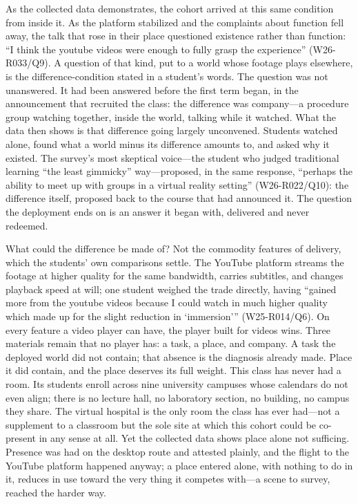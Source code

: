 As the collected data demonstrates, the cohort arrived at this same
condition from inside it. As the platform stabilized and the
complaints about function fell away, the talk that rose in their place
questioned existence rather than function: ``I think the youtube
videos were enough to fully grasp the experience'' (W26-R033/Q9). A
question of that kind, put to a world whose footage plays elsewhere,
is the difference-condition stated in a student's words. The question
was not unanswered. It had been answered before the first term began,
in the announcement that recruited the class: the difference was
company---a procedure group watching together, inside the world,
talking while it watched. What the data then shows is that
difference going largely unconvened. Students watched alone, found
what a world minus its difference amounts to, and asked why it
existed. The survey's most skeptical voice---the student who judged
traditional learning ``the least gimmicky'' way---proposed, in the
same response, ``perhaps the ability to meet up with groups in a
virtual reality setting'' (W26-R022/Q10): the difference itself,
proposed back to the course that had announced it. The question the
deployment ends on is an answer it began with, delivered and never
redeemed.

What could the difference be made of? Not the commodity features of
delivery, which the students' own comparisons settle. The YouTube
platform streams the footage at higher quality for the same bandwidth,
carries subtitles, and changes playback speed at will; one student
weighed the trade directly, having ``gained more from the youtube
videos because I could watch in much higher quality which made up for
the slight reduction in `immersion'{}'' (W25-R014/Q6). On every
feature a video player can have, the player built for videos wins.
Three materials remain that no player has: a task, a place, and
company. A task the deployed world did not contain; that absence is
the diagnosis already made. Place it did contain, and the place
deserves its full weight. This class has never had a room. Its
students enroll across nine university campuses whose calendars do not
even align; there is no lecture hall, no laboratory section, no
building, no campus they share. The virtual hospital is the only room
the class has ever had---not a supplement to a classroom but the sole
site at which this cohort could be co-present in any sense at all. Yet
the collected data shows place alone not sufficing. Presence was had
on the desktop route and attested plainly, and the flight to the
YouTube platform happened anyway; a place entered alone, with nothing
to do in it, reduces in use toward the very thing it competes
with---a scene to survey, reached the harder way.

